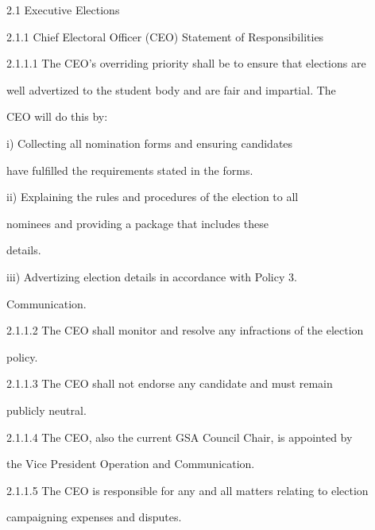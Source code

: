                                 2.1      Executive Elections  

  

2.1.1  Chief Electoral Officer (CEO) Statement of Responsibilities  

  

2.1.1.1        The CEO’s overriding priority shall be to ensure that elections are  

               well advertized to the student body and are fair and impartial. The  

                CEO will do this by:   

  

                   i)       Collecting all nomination forms and ensuring candidates  

                            have fulfilled the requirements stated in the forms.   

  

                   ii)      Explaining the rules and procedures of the election to all  

                            nominees  and  providing  a  package  that  includes  these  

                            details.   

  

                   iii)     Advertizing election details in accordance with Policy 3.  



                            Communication.   

  

2.1.1.2        The CEO shall monitor and resolve any infractions of the election  

               policy.   

  

2.1.1.3        The  CEO  shall  not  endorse  any  candidate  and  must  remain  

               publicly neutral.   

  

2.1.1.4        The  CEO,  also the  current  GSA  Council  Chair,  is  appointed  by  

               the Vice President Operation and Communication.   

  

2.1.1.5        The CEO is responsible for any and all matters relating to election  

                campaigning expenses and disputes.   

